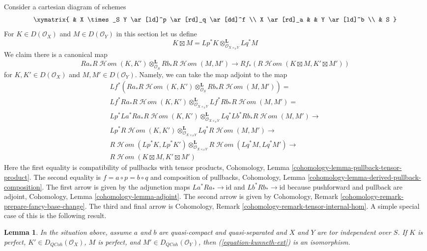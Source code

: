 \documentclass{stacks-project}
\theoremstyle{plain}
\newtheorem{lemma}[subsection]{Lemma}
\theoremstyle{definition}
\theoremstyle{remark}
\numberwithin{equation}{subsection}
\def\SheafHom{\mathop{\mathcal{H}\!\mathit{om}}\nolimits}
\def\QCoh{\mathit{QCoh}}
\begin{document}
\noindent
Consider a cartesian diagram of schemes
$$
\xymatrix{
& X \times_S Y \ar[ld]^p \ar[rd]_q \ar[dd]^f \\
X \ar[rd]_a & & Y \ar[ld]^b \\
& S
}
$$
For $K \in D(\mathcal{O}_X)$ and $M \in D(\mathcal{O}_Y)$
in this section let us define
$$
K \boxtimes M =
Lp^*K \otimes_{\mathcal{O}_{X \times_S Y}}^\mathbf{L} Lq^*M
$$
We claim there is a canonical map
\begin{equation}
\label{equation-kunneth-ext}
Ra_*R\SheafHom(K, K')
\otimes_{\mathcal{O}_S}^\mathbf{L}
Rb_*R\SheafHom(M, M')
\longrightarrow
Rf_*(R\SheafHom(K \boxtimes M, K' \boxtimes M'))
\end{equation}
for $K, K' \in D(\mathcal{O}_X)$ and $M, M' \in D(\mathcal{O}_Y)$.
Namely, we can take the map adjoint to the map
$$
\begin{matrix}
Lf^*\left(Ra_*R\SheafHom(K, K')
\otimes_{\mathcal{O}_S}^\mathbf{L}
Rb_* R\SheafHom(M, M')\right) = \\
Lf^* Ra_* R\SheafHom(K, K')
\otimes_{\mathcal{O}_{X \times_S Y}}^\mathbf{L}
Lf^* Rb_* R\SheafHom(M, M') = \\
Lp^* La^* Ra_* R\SheafHom(K, K')
\otimes_{\mathcal{O}_{X \times_S Y}}^\mathbf{L}
Lq^* Lb^* Rb_* R\SheafHom(M, M') \to \\
Lp^* R\SheafHom(K, K')
\otimes_{\mathcal{O}_{X \times_S Y}}^\mathbf{L}
Lq^* R\SheafHom(M, M') \to \\
R\SheafHom(Lp^*K, Lp^*K')
\otimes_{\mathcal{O}_{X \times_S Y}}^\mathbf{L}
R\SheafHom(Lq^*M, Lq^*M') \to \\
R\SheafHom(K \boxtimes M, K' \boxtimes M')
\end{matrix}
$$
Here the first equality is compatibility of pullbacks with tensor products,
Cohomology, Lemma \ref{cohomology-lemma-pullback-tensor-product}.
The second equality is $f = a \circ p = b \circ q$ and
composition of pullbacks,
Cohomology, Lemma \ref{cohomology-lemma-derived-pullback-composition}.
The first arrow is given by the adjunction maps
$La^* Ra_* \to \text{id}$ and
$Lb^* Rb_* \to \text{id}$ because pushforward and pullback are adjoint,
Cohomology, Lemma \ref{cohomology-lemma-adjoint}.
The second arrow is given by
Cohomology, Remark \ref{cohomology-remark-prepare-fancy-base-change}.
The third and final arrow is
Cohomology, Remark \ref{cohomology-remark-tensor-internal-hom}.
A simple special case of this is the following result.

\begin{lemma}
\label{lemma-kunneth-Ext}
In the situation above, assume $a$ and $b$ are quasi-compact and
quasi-separated and $X$ and $Y$ are tor independent over $S$.
If $K$ is perfect, $K' \in D_\QCoh(\mathcal{O}_X)$, $M$ is perfect, and
$M' \in D_\QCoh(\mathcal{O}_Y)$, then (\ref{equation-kunneth-ext})
is an isomorphism.
\end{lemma}
\end{document}
